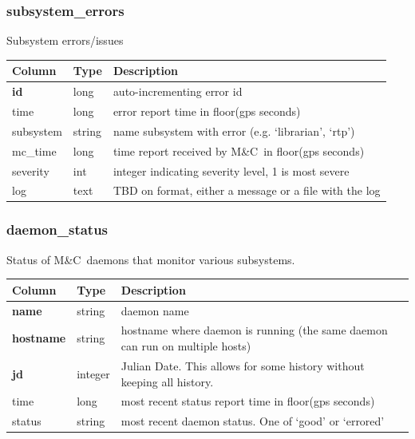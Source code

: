 \documentclass{article}
\newcommand{\mc}{M\&C}
\begin{document}
{\subsubsection{subsystem\_errors}
Subsystem errors/issues
\begin{center}
 \begin{tabular}{| p{4cm} | p{2cm} | p{10cm} |}
\hline
 {\bf Column} & {\bf Type}  & {\bf Description} \\ [0.5ex]  \hline\hline
\textbf{id} & long & auto-incrementing error id\\ \hline
time & long & error report time in floor(gps seconds)\\ \hline
subsystem & string & name subsystem with error (e.g. `librarian', `rtp')\\ \hline
mc\_time & long & time report received by \mc\ in floor(gps seconds) \\ \hline
severity & int & integer indicating severity level, 1 is most severe \\ \hline
log & text & TBD on format, either a message or a file with the log \\ \hline
\end{tabular}
\end{center}


\subsubsection{daemon\_status}
Status of \mc\ daemons that monitor various subsystems.
\begin{center}
 \begin{tabular}{| p{4cm} | p{2cm} | p{10cm} |}
\hline
 {\bf Column} & {\bf Type}  & {\bf Description} \\ [0.5ex]  \hline\hline
\textbf{name} & string & daemon name\\ \hline
\textbf{hostname} & string & hostname where daemon is running (the same daemon can run on multiple hosts)\\ \hline
\textbf{jd} & integer & Julian Date. This allows for some history without keeping all history.\\ \hline
time & long & most recent status report time in floor(gps seconds)\\ \hline
status & string & most recent daemon status. One of `good' or `errored'\\ \hline
\end{tabular}
\end{center}


}
\end{document}
